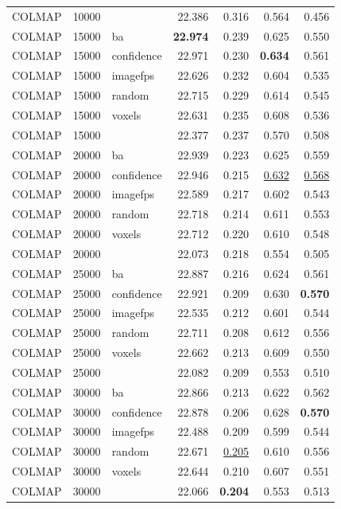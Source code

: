 \begin{table}[H]
\begin{tabular}{lrlrrrr}
COLMAP & 10000 &  & 22.386 & 0.316 & 0.564 & 0.456 \\
COLMAP & 15000 & ba & \textbf{22.974} & 0.239 & 0.625 & 0.550 \\
COLMAP & 15000 & confidence & 22.971 & 0.230 & \textbf{0.634} & 0.561 \\
COLMAP & 15000 & imagefps & 22.626 & 0.232 & 0.604 & 0.535 \\
COLMAP & 15000 & random & 22.715 & 0.229 & 0.614 & 0.545 \\
COLMAP & 15000 & voxels & 22.631 & 0.235 & 0.608 & 0.536 \\
COLMAP & 15000 &  & 22.377 & 0.237 & 0.570 & 0.508 \\
COLMAP & 20000 & ba & 22.939 & 0.223 & 0.625 & 0.559 \\
COLMAP & 20000 & confidence & 22.946 & 0.215 & \underline{0.632} & \underline{0.568} \\
COLMAP & 20000 & imagefps & 22.589 & 0.217 & 0.602 & 0.543 \\
COLMAP & 20000 & random & 22.718 & 0.214 & 0.611 & 0.553 \\
COLMAP & 20000 & voxels & 22.712 & 0.220 & 0.610 & 0.548 \\
COLMAP & 20000 &  & 22.073 & 0.218 & 0.554 & 0.505 \\
COLMAP & 25000 & ba & 22.887 & 0.216 & 0.624 & 0.561 \\
COLMAP & 25000 & confidence & 22.921 & 0.209 & 0.630 & \textbf{0.570} \\
COLMAP & 25000 & imagefps & 22.535 & 0.212 & 0.601 & 0.544 \\
COLMAP & 25000 & random & 22.711 & 0.208 & 0.612 & 0.556 \\
COLMAP & 25000 & voxels & 22.662 & 0.213 & 0.609 & 0.550 \\
COLMAP & 25000 &  & 22.082 & 0.209 & 0.553 & 0.510 \\
COLMAP & 30000 & ba & 22.866 & 0.213 & 0.622 & 0.562 \\
COLMAP & 30000 & confidence & 22.878 & 0.206 & 0.628 & \textbf{0.570} \\
COLMAP & 30000 & imagefps & 22.488 & 0.209 & 0.599 & 0.544 \\
COLMAP & 30000 & random & 22.671 & \underline{0.205} & 0.610 & 0.556 \\
COLMAP & 30000 & voxels & 22.644 & 0.210 & 0.607 & 0.551 \\
COLMAP & 30000 &  & 22.066 & \textbf{0.204} & 0.553 & 0.513 \\
\bottomrule
\end{tabular}
\end{table}
